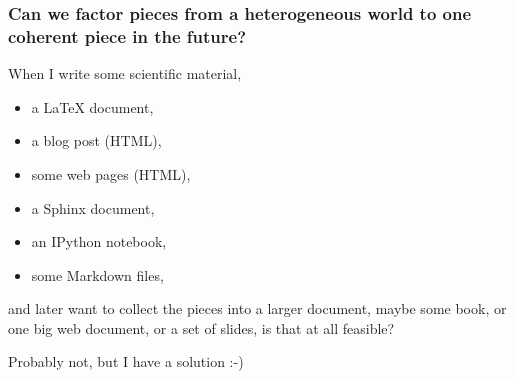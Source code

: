 \documentclass{beamer}
\begin{document}
\begin{frame}
\frametitle{Can we factor pieces from a heterogeneous world to one coherent piece in the future?}

When I write some scientific material,

\begin{itemize}
 \item a {\LaTeX} document,

 \item a blog post (HTML),

 \item some web pages (HTML),

 \item a Sphinx document,

 \item an IPython notebook,

 \item some Markdown files,
\end{itemize}

\noindent
and later want to collect the pieces into a larger document, maybe
some book, or one big web document, or a set of slides,
is that at all feasible?


\pause
\begin{block}{}
Probably not, but I have a solution :-)
\end{block}
\end{frame}
\end{document}
